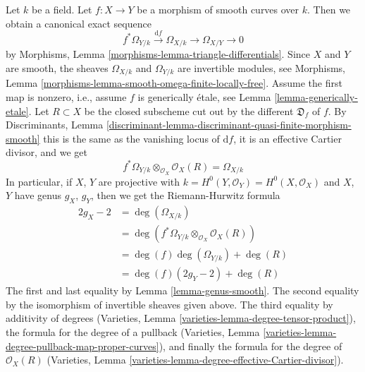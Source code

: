 \documentclass{stacks-project}
\theoremstyle{plain}
\theoremstyle{definition}
\theoremstyle{remark}
\numberwithin{equation}{subsection}
\begin{document}
\noindent
Let $k$ be a field. Let $f : X \to Y$ be a morphism of smooth curves over $k$.
Then we obtain a canonical exact sequence
$$
f^*\Omega_{Y/k} \xrightarrow{\text{d}f} \Omega_{X/k}
\longrightarrow \Omega_{X/Y} \longrightarrow 0
$$
by Morphisms, Lemma \ref{morphisms-lemma-triangle-differentials}.
Since $X$ and $Y$ are smooth, the sheaves $\Omega_{X/k}$ and
$\Omega_{Y/k}$ are invertible modules, see
Morphisms, Lemma \ref{morphisms-lemma-smooth-omega-finite-locally-free}.
Assume the first map is nonzero, i.e., assume $f$ is generically
\'etale, see Lemma \ref{lemma-generically-etale}. Let $R \subset X$
be the closed subscheme cut out by the different $\mathfrak{D}_f$ of $f$.
By Discriminants, Lemma
\ref{discriminant-lemma-discriminant-quasi-finite-morphism-smooth}
this is the same as the vanishing locus of $\text{d}f$, it is
an effective Cartier divisor, and we get
$$
f^*\Omega_{Y/k} \otimes_{\mathcal{O}_X} \mathcal{O}_X(R) = \Omega_{X/k}
$$
In particular, if $X$, $Y$ are projective with
$k = H^0(Y, \mathcal{O}_Y) = H^0(X, \mathcal{O}_X)$
and $X$, $Y$ have genus $g_X$, $g_Y$, then we get the
Riemann-Hurwitz formula
\begin{align*}
2g_X - 2 & =
\deg(\Omega_{X/k}) \\
& =
\deg(f^*\Omega_{Y/k} \otimes_{\mathcal{O}_X} \mathcal{O}_X(R)) \\
& =
\deg(f) \deg(\Omega_{Y/k}) + \deg(R) \\
& =
\deg(f) (2g_Y - 2) + \deg(R)
\end{align*}
The first and last equality by Lemma \ref{lemma-genus-smooth}.
The second equality by the isomorphism of invertible sheaves given above.
The third equality by additivity of degrees
(Varieties, Lemma \ref{varieties-lemma-degree-tensor-product}),
the formula for the degree of a pullback
(Varieties, Lemma \ref{varieties-lemma-degree-pullback-map-proper-curves}),
and finally the formula for the degree of $\mathcal{O}_X(R)$
(Varieties, Lemma \ref{varieties-lemma-degree-effective-Cartier-divisor}).
\end{document}

